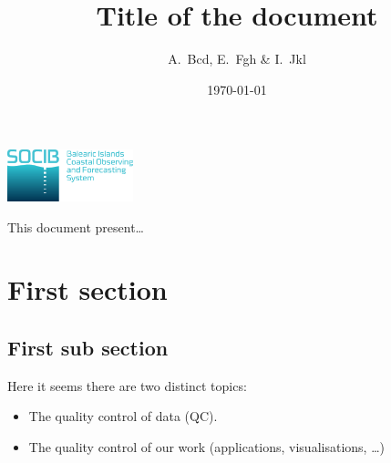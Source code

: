 \documentclass[12pt,svgnames,final]{article}
\title{Title of the document}
\author{A.~Bcd, E.~Fgh \& I.~Jkl}
\date{\today}
\begin{document}
\thispagestyle{empty}
\begin{titlepage}

\centering

\vspace*{3.5cm}

{\Huge \thetitle}

\vspace{1cm}

\includegraphics[height=1.5cm]{logo_socib.eps}

\vspace{1cm}

\theauthor

\vspace{1cm}
{\normalsize \thedate}

\end{titlepage}

\pagestyle{fancy}


This document present\ldots

\tableofcontents

\newpage


\section{First section}

\subsection{First sub section}

Here it seems there are two distinct topics:
\begin{itemize}
\item The quality control of data (QC). 
\item The quality control of our work (applications, visualisations, \ldots)
\end{itemize}
\end{document}
